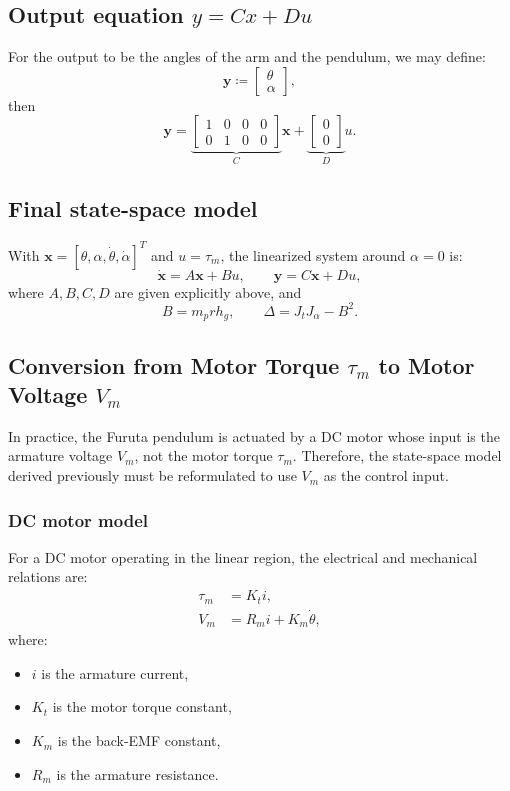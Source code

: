 \documentclass[12pt,a4paper]{article}
\begin{document}
\subsection{Output equation $y=Cx+Du$}

For the output to be the angles of the arm and the pendulum, we may define:
\[
\bm y \coloneqq
\begin{bmatrix}
\theta\\
\alpha
\end{bmatrix},
\]
then
\[
\boxed{
\bm y
=
\underbrace{
\begin{bmatrix}
1 & 0 & 0 & 0\\
0 & 1 & 0 & 0
\end{bmatrix}
}_{C}
\bm x
+
\underbrace{
\begin{bmatrix}
0\\
0
\end{bmatrix}
}_{D}
u.
}
\]

\subsection{Final state-space model}

With
$
\bm x=[\theta,\alpha,\dot\theta,\dot\alpha]^T
$
and
$
u=\tau_m
$,
the linearized system around $\alpha=0$ is:
\[
\boxed{
\dot{\bm x}=A\bm x+Bu,\qquad \bm y=C\bm x+Du,
}
\]
where $A,B,C,D$ are given explicitly above, and
\[
B=m_p r h_g,\qquad \Delta=J_tJ_\alpha-B^2.
\]
\subsection{Conversion from Motor Torque $\tau_m$ to Motor Voltage $V_m$}

In practice, the Furuta pendulum is actuated by a DC motor whose input is the armature voltage $V_m$, not the motor torque $\tau_m$. Therefore, the state-space model derived previously must be reformulated to use $V_m$ as the control input.

\subsubsection{DC motor model}

For a DC motor operating in the linear region, the electrical and mechanical relations are:
\begin{align}
\tau_m &= K_t i, \label{eq:tau_current}\\
V_m &= R_m i + K_m \dot\theta, \label{eq:voltage_eq}
\end{align}
where:
\begin{itemize}
  \item $i$ is the armature current,
  \item $K_t$ is the motor torque constant,
  \item $K_m$ is the back-EMF constant,
  \item $R_m$ is the armature resistance.
\end{itemize}
\end{document}
